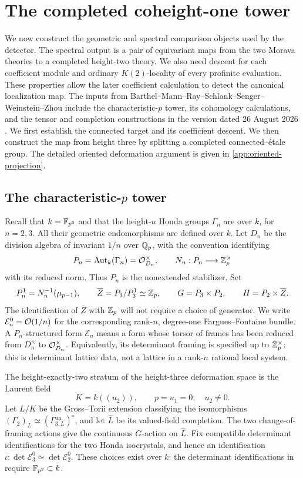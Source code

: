 \section{The completed coheight-one tower}
\label{sec:completed-tower}

We now construct the geometric and spectral comparison objects used by
the detector. The spectral output is a pair of equivariant maps from the
two Morava theories to a completed height-two theory. We also need descent for each
coefficient module and ordinary \(K(2)\)-locality of every profinite
evaluation. These properties allow the later coefficient calculation to
detect the canonical localization map. The inputs
from Barthel--Mann--Ray--Schlank--Senger--Weinstein--Zhou include the
characteristic-\(p\) tower, its cohomology calculations, and the tensor
and completion constructions
in the version dated 26 August 2026 \cite{BMR2026}. We first establish
the connected target and its coefficient descent.
We then construct the map from height three by splitting a completed
connected--\'etale group. The detailed oriented deformation argument is
given in \cref{app:oriented-projection}.

\subsection{The characteristic-\(p\) tower}

Recall that $k=\mathbb F_{p^6}$ and that the height-$n$ Honda groups $\Gamma_n$ are over $k$,
for $n=2,3$.  All their geometric endomorphisms are defined over $k$.
Let $D_n$ be the division algebra of invariant $1/n$ over $\mathbb Q_p$, with
the convention identifying
\[
 P_n=\operatorname{Aut}_k(\Gamma_n)=\mathcal O_{D_n}^{\times},\qquad
 N_n:P_n\longrightarrow\mathbb Z_p^{\times}
\]
with its reduced norm.  Thus $P_n$ is the nonextended stabilizer.  Set
\[
 P_n^1=N_n^{-1}(\mu_{p-1}),\qquad
 \overline Z=P_3/P_3^1\simeq\mathbb Z_p,\qquad
 G=P_3\times P_2,\qquad H=P_2\times\overline Z.
\]
The identification of $\overline Z$ with $\mathbb Z_p$ will not require a choice
of generator.  We write $\mathcal E_n^0=\mathcal O(1/n)$ for the corresponding
rank-$n$, degree-one Fargues--Fontaine bundle.  A $P_n$-structured form
$\mathcal E_n$ means a form whose torsor of frames has been reduced from
$D_n^{\times}$ to $\mathcal O_{D_n}^{\times}$.  Equivalently, its determinant
framing is specified up to $\mathbb Z_p^{\times}$; this is determinant lattice
data, not a lattice in a rank-$n$ rational local system.

The height-exactly-two stratum of the height-three deformation space is
the Laurent field
\[
 K=k((u_2)),\qquad p=u_1=0,\quad u_2\ne0.
\]
Let $L/K$ be the Gross--Torii extension classifying the isomorphisms
$(\Gamma_2)_L\simeq(\Gamma^{\mathrm{un}}_{3,L})^{\circ}$, and let
$\widehat L$ be its valued-field completion.  The two change-of-framing
actions give the continuous $G$-action on $\widehat L$.  Fix compatible
determinant identifications for the two Honda isocrystals, and hence an
identification
$\iota:\det\mathcal E_3^0\simeq\det\mathcal E_2^0$.
These choices exist over $k$: the determinant identifications in
\cite[\S2.7]{BMR2026} require $\mathbb F_{p^2}\subset k$.

